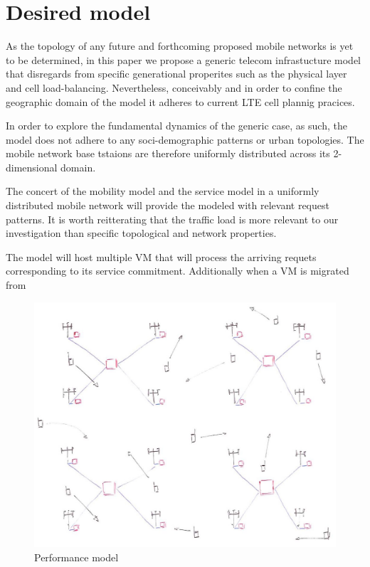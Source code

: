 \section{Desired model}

As the topology of any future \xcloud and forthcoming proposed mobile networks is yet to be determined, in this paper we propose a generic telecom infrastucture model that disregards from specific generational properites such as the physical layer and cell load-balancing. Nevertheless, conceivably and in order to confine the geographic domain of the model it adheres to current LTE cell plannig pracices. 

In order to explore the fundamental dynamics of the generic case, as such, the model does not adhere to any soci-demographic patterns or urban topologies. The mobile network base tstaions are therefore uniformly distributed across its 2-dimensional domain.



The concert of the mobility model and the service model in a uniformly distributed mobile network will provide the modeled \dcs with relevant request patterns. It is worth reitterating that the traffic load is more relevant to our investigation than specific topological and network properties.

The \dc model will host multiple VM that will process the arriving requets corresponding to its service commitment. Additionally when a VM is migrated from   

\begin{figure}[tb]
	\centering
	\includegraphics[width=\linewidth]{performance_delay.jpg} 
	\caption{Performance model}
	\label{fig:performance_model}
\end{figure}